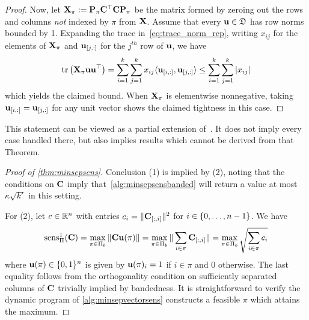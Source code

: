 \documentclass{article}
\begin{document}
\begin{proof}


Now, let $\mathbf{X}_\pi := \mathbf{P}_\pi \mathbf{C}^\top\mathbf{C} \mathbf{P}_\pi$ be the matrix formed by zeroing out the rows and columns \emph{not} indexed by $\pi$ from $\mathbf{X}$. Assume that every $\mathbf{u} \in \mathfrak{D}$ has row norms bounded by 1. Expanding the trace in~\cref{eq:trace_norm_rep}, writing $x_{ij}$ for the elements of $\mathbf{X}_\pi$ and $\mathbf{u}_{[j, :]}$ for the $j^{th}$ row of $\mathbf{u}$, we have 
$$
\mathrm{tr}\left(\mathbf{X}_\pi \mathbf{u}\mathbf{u}^\top\right) = \sum_{i=1}^k\sum_{j=1}^k x_{ij}\langle \mathbf{u}_{[i, :]}, \mathbf{u}_{[j, :]}\rangle \leq \sum_{i=1}^k\sum_{j=1}^k |x_{ij}|
$$
which yields the claimed bound. When $\mathbf{X}_\pi$ is elementwise nonnegative, taking $\mathbf{u}_{[i, :]} = \mathbf{u}_{[j, :]}$ for any unit vector shows the claimed tightness in this case.


\end{proof}
 This statement can be viewed as a partial extension of~\citep[Theorem G.1]{choquette2022multi}. It does not imply every case handled there, but also implies results which cannot be derived from that Theorem.


\begin{proof}[Proof of \cref{thm:minsepsens}]
Conclusion (1) is implied by (2), noting that the conditions on $\mathbf{C}$ imply that~\cref{alg:minsepsensbanded} will return a value at most $\kappa\sqrt{k'}$ in this setting.


For (2), let $c \in \mathbb{R}^{n}$ with entries $c_i = \| \mathbf{C}_{[:, i]} \|^2$ for $i \in \{0, \dots, n-1\}$. We have
\begin{equation}\label{eq:orthcolnorm}
\operatorname{sens}^1_{\Pi}(\mathbf{C}) 
  = \max_{\pi \in \Pi_b} \| \mathbf{C} \mathbf{u}(\pi) \| 
  = \max_{\pi \in \Pi_b} \| \sum_{i \in \pi} \mathbf{C}_{[:, i]} \|  
  = \max_{\pi \in \Pi_b} \sqrt{\sum_{i \in \pi} c_i}
\end{equation}
where $\mathbf{u}(\pi) \in \{0, 1\}^{n}$ is given by $\mathbf{u}(\pi)_i = 1$ if $i \in \pi$ and $0$ otherwise. The last equality follows from the orthogonality condition on sufficiently separated columns of $\mathbf{C}$ trivially implied by bandedness. It is straightforward to verify the dynamic program of \cref{alg:minsepvectorsens} constructs a feasible $\pi$ which attains the maximum.
\end{proof}
\end{document}
